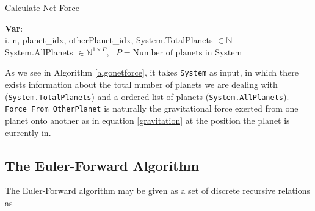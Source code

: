 	\IncMargin{1em}
	\begin{algorithm}[H]
		\caption{Calculate Net Force}
		\label{algonetforce}
		\SetAlgoLined
		
		\textbf{Var}:\\
		i, n, planet\_idx, otherPlanet\_idx, System.TotalPlanets $\in \mathbb{N}$\\
		System.AllPlanets $\in \mathbb{N}^{1\times P}, \ \ \ P = \text{Number of planets in System}$
		
	\end{algorithm}
	As we see in Algorithm \ref{algonetforce}, it takes \texttt{System} as input, in which there exists information about the total number of planets we are dealing with (\texttt{System.TotalPlanets}) and a ordered list of planets (\texttt{System.AllPlanets}). \texttt{Force\_From\_OtherPlanet} is naturally the gravitational force exerted from one planet onto another as in equation \ref{gravitation} at the position the planet is currently in. 
	
	\subsection{The Euler-Forward Algorithm}
	The Euler-Forward algorithm may be given as a set of discrete recursive relations as
	
